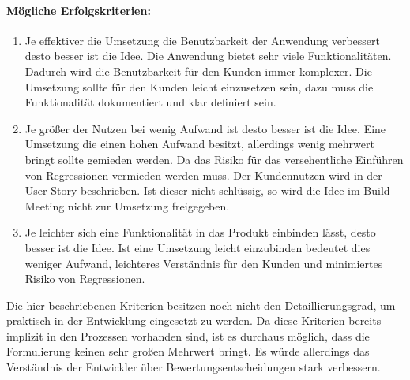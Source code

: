 \paragraph{Mögliche Erfolgskriterien:}
\begin{enumerate}
    \item Je effektiver die Umsetzung die Benutzbarkeit der Anwendung verbessert desto besser ist die Idee. Die Anwendung bietet sehr viele Funktionalitäten. Dadurch 
    wird die Benutzbarkeit für den Kunden immer komplexer. Die Umsetzung sollte für den Kunden leicht einzusetzen sein, dazu muss die Funktionalität dokumentiert und klar definiert sein. 
    \item Je größer der Nutzen bei wenig Aufwand ist desto besser ist die Idee. Eine Umsetzung die einen hohen Aufwand besitzt, allerdings wenig mehrwert bringt sollte 
    gemieden werden. Da das Risiko für das versehentliche Einführen von Regressionen vermieden werden muss. Der Kundennutzen wird in der User-Story beschrieben. Ist dieser nicht schlüssig, 
    so wird die Idee im Build-Meeting nicht zur Umsetzung freigegeben. 
    \item Je leichter sich eine Funktionalität in das Produkt einbinden lässt, desto besser ist die Idee. Ist eine Umsetzung leicht einzubinden bedeutet dies 
    weniger Aufwand, leichteres Verständnis für den Kunden und minimiertes Risiko von Regressionen.
\end{enumerate}

Die hier beschriebenen Kriterien besitzen noch nicht den Detaillierungsgrad, um praktisch in der Entwicklung eingesetzt zu werden.
Da diese Kriterien bereits implizit in den Prozessen vorhanden sind, ist es durchaus 
möglich, dass die Formulierung keinen sehr großen Mehrwert bringt. Es würde allerdings das Verständnis der Entwickler über Bewertungsentscheidungen stark 
verbessern. 